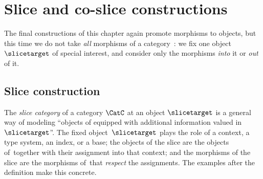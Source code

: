 
\section{Slice and co-slice constructions}
\label{sec:coslice}


The final constructions of this chapter again promote morphisms to objects, but this time we do not take \emph{all} morphisms of a category~\CatC: we fix one object~$\slicetarget$ of special interest, and consider only the morphisms \emph{into} it or \emph{out} of it.

\subsection{Slice construction}

The \emph{slice category} of a category $\CatC$ at an object $\slicetarget$ is a general way of modeling ``objects of \CatC equipped with additional information valued in~$\slicetarget$''.
The fixed object~$\slicetarget$ plays the role of a context, a type system, an index, or a base; the objects of the slice are the objects of~\CatC together with their assignment into that context; and the morphisms of the slice are the morphisms of~\CatC that \emph{respect} the assignments.
The examples after the definition make this concrete.

